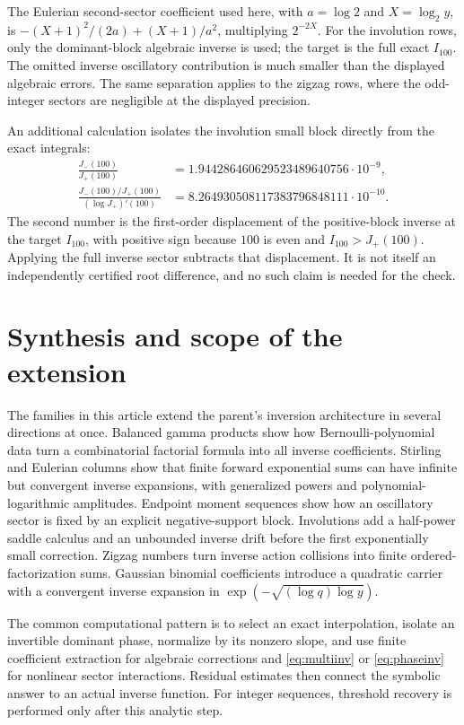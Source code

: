 \documentclass[11pt,a4paper]{article}
\theoremstyle{definition}
\theoremstyle{remark}
\numberwithin{equation}{section}
\begin{document}
The Eulerian second-sector coefficient used here, with $a=\log2$ and $X=\log_2 y$, is
$-(X+1)^2/(2a)+(X+1)/a^2$, multiplying $2^{-2X}$.
For the involution rows, only the dominant-block algebraic inverse is used; the target is the full exact $I_{100}$. The omitted inverse oscillatory contribution is much smaller than the displayed algebraic errors. The same separation applies to the zigzag rows, where the odd-integer sectors are negligible at the displayed precision.

An additional calculation isolates the involution small block directly from the exact integrals:
\begin{align}
 \frac{J_-(100)}{J_+(100)}
 &=1.944286460629523489640756\cdot10^{-9},\nonumber\\
 \frac{J_-(100)/J_+(100)}{(\log J_+)'(100)}
 &=8.264930508117383796848111\cdot10^{-10}.
 \label{eq:ivsmallnumeric}
\end{align}
The second number is the first-order displacement of the positive-block inverse at the target $I_{100}$, with positive sign because $100$ is even and $I_{100}>J_+(100)$. Applying the full inverse sector subtracts that displacement. It is not itself an independently certified root difference, and no such claim is needed for the check.

\section{Synthesis and scope of the extension}
\label{sec:conclusion}
The families in this article extend the parent's inversion architecture in several directions at once. Balanced gamma products show how Bernoulli-polynomial data turn a combinatorial factorial formula into all inverse coefficients. Stirling and Eulerian columns show that finite forward exponential sums can have infinite but convergent inverse expansions, with generalized powers and polynomial-logarithmic amplitudes. Endpoint moment sequences show how an oscillatory sector is fixed by an explicit negative-support block. Involutions add a half-power saddle calculus and an unbounded inverse drift before the first exponentially small correction. Zigzag numbers turn inverse action collisions into finite ordered-factorization sums. Gaussian binomial coefficients introduce a quadratic carrier with a convergent inverse expansion in $\exp(-\sqrt{(\log q)\log y})$.

The common computational pattern is to select an exact interpolation, isolate an invertible dominant phase, normalize by its nonzero slope, and use finite coefficient extraction for algebraic corrections and \eqref{eq:multiinv} or \eqref{eq:phaseinv} for nonlinear sector interactions. Residual estimates then connect the symbolic answer to an actual inverse function. For integer sequences, threshold recovery is performed only after this analytic step.
\end{document}
